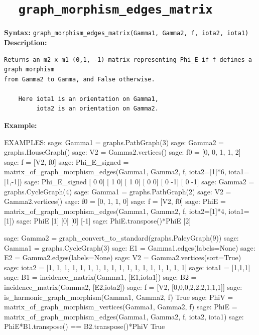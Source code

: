 \documentclass{article}
\begin{document}
\section{\tt \ \ graph\_morphism\_edges\_matrix}

\textbf{Syntax:} \verb}graph_morphism_edges_matrix(Gamma1, Gamma2, f, iota2, iota1)}\\

\textbf{Description:}
\begin{verbatim}
Returns an m2 x m1 (0,1, -1)-matrix representing Phi_E if f defines a graph morphism
from Gamma2 to Gamma, and False otherwise. 

    Here iota1 is an orientation on Gamma1,
         iota2 is an orientation on Gamma2. 
\end{verbatim}

\textbf{Example:}
\begin{spverbatim}
    EXAMPLES:
        sage: Gamma1 = graphs.PathGraph(3)
        sage: Gamma2 = graphs.HouseGraph()
        sage: V2 = Gamma2.vertices()
        sage: f0 = [0, 0, 1, 1, 2]
        sage: f = [V2, f0]
        sage: Phi_E_signed = matrix_of_graph_morphism_edges(Gamma1, Gamma2, f, iota2=[1]*6, iota1=[1,-1])
        sage: Phi_E_signed
	[ 0  0]
	[ 1  0]
	[ 1  0]
	[ 0  0]
	[ 0 -1]
	[ 0 -1]
        sage: Gamma2 = graphs.CycleGraph(4)
        sage: Gamma1 = graphs.PathGraph(2)
        sage: V2 = Gamma2.vertices()
        sage: f0 = [0, 1, 1, 0]
        sage: f = [V2, f0]
        sage: PhiE = matrix_of_graph_morphism_edges(Gamma1, Gamma2, f, iota2=[1]*4, iota1=[1])
        sage: PhiE
        [1]
        [0]
        [0]
        [-1]
        sage: PhiE.transpose()*PhiE
        [2]

        sage: Gamma2 = graph_convert_to_standard(graphs.PaleyGraph(9))
        sage: Gamma1 = graphs.CycleGraph(3)
        sage: E1 = Gamma1.edges(labels=None)
        sage: E2 = Gamma2.edges(labels=None)
        sage: V2 = Gamma2.vertices(sort=True)
        sage: iota2 = [1, 1, 1, 1, 1, 1, 1, 1, 1, 1, 1, 1, 1, 1, 1, 1, 1, 1]
        sage: iota1 = [1,1,1]
        sage: B1 = incidence_matrix(Gamma1, [E1,iota1])
        sage: B2 = incidence_matrix(Gamma2, [E2,iota2])
        sage: f = [V2, [0,0,0,2,2,2,1,1,1]]
        sage: is_harmonic_graph_morphism(Gamma1, Gamma2, f) 
        True
        sage: PhiV = matrix_of_graph_morphism_vertices(Gamma1, Gamma2, f)
        sage: PhiE = matrix_of_graph_morphism_edges(Gamma1, Gamma2, f, iota2, iota1)
        sage: PhiE*B1.transpose() == B2.transpose()*PhiV   
        True
\end{spverbatim}
\end{document}
